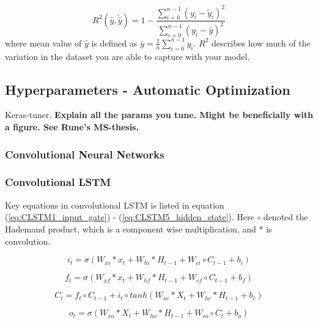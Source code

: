 \begin{equation} \label{eq:r2}
    R^2(\hat{y}, \tilde{\hat{y}}) = 1 - \frac{\sum_{i=0}^{n - 1} (y_i - \tilde{y}_i)^2}{\sum_{i=0}^{n - 1} (y_i - \bar{y})^2}
\end{equation} 
where mean value of $\hat{y}$ is defined as $\bar{y} =  \frac{1}{n} \sum_{i=0}^{n - 1} y_i$. $R^2$ describes how much of the variation in the dataset you are able to capture with your model.



\subsection{Hyperparameters - Automatic Optimization}
Keras-tuner.
\textbf{Explain all the params you tune. Might be beneficially with a figure. See Rune's MS-thesis.}



\subsubsection{Convolutional Neural Networks}



\subsubsection{Convolutional LSTM}
\label{sec:conv_lstm}
Key equations in convolutional LSTM is listed in equation (\ref{eq:CLSTM1_input_gate}) - (\ref{eq:CLSTM5_hidden_state}). Here $\circ$ denoted the Hademand product, which is a component wise multiplication, and * is convolution. 

\begin{equation} \label{eq:CLSTM1_input_gate}
    i_t = \sigma \left( W_{xi}*x_t + W_{hi}*H_{t-1} + W_{ci}\circ C_{t-1}+b_i \right) 
\end{equation}

\begin{equation} \label{eq:CLSTM2_forget_gate}
        f_t = \sigma \left( W_{xf}*x_t + W_{hf}*H_{t-1} + W_{cf}\circ C_{t-1}+b_f \right) 
\end{equation}

\begin{equation} \label{eq:CLSTM3_cellstate}
        C_t = f_t \circ C_{t-1} +i_t\circ tanh\left( W_{xc}*X_t + W_{hc}*H_{t-1} + b_c \right)
\end{equation}

\begin{equation} \label{eq:CLSTM4_output_gate}
        o_t = \sigma \left( W_{xo}*X_t + W_{ho}*H_{t-1} + W_{co}\circ C_{t}+b_o \right)
\end{equation}

